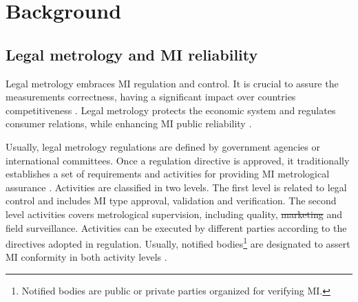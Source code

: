 \documentclass[journal]{IEEEtran}
\providecommand{\DIFadd}[1]{{\protect\color{blue}\uwave{#1}}} %
\providecommand{\DIFdel}[1]{{\protect\color{red}\sout{#1}}}                      %
\providecommand{\DIFaddbegin}{} %
\providecommand{\DIFaddend}{} %
\providecommand{\DIFdelbegin}{} %
\providecommand{\DIFdelend}{} %
\begin{document}

\section{Background}
\subsection{Legal metrology and MI reliability}
\label{s:mi_realiability}
Legal metrology embraces MI regulation and control. It is crucial to assure the measurements correctness, having a significant impact over countries competitiveness \cite{RodriguesFilho2015}. Legal metrology protects the economic system and regulates consumer relations, while enhancing MI public reliability \cite{Oppermann2016}.

Usually, legal metrology regulations are defined by government agencies or international committees. Once a regulation directive is approved, it traditionally establishes a set of requirements and activities for providing MI metrological assurance \cite{RodriguesFilho2015}. Activities are classified in two levels. The first level is related to legal control and includes MI type approval, validation and verification. The second level activities covers metrological supervision, including quality, \DIFdelbegin \DIFdel{marketing }\DIFdelend \DIFaddbegin \DIFadd{market }\DIFaddend and field surveillance. Activities can be executed by different parties according to the directives adopted in regulation. Usually, notified bodies\footnote{Notified bodies are public or private parties organized for verifying MI.} are designated to assert MI conformity in both activity levels \cite{Esche2015,Oppermann2016}. 
\end{document}
